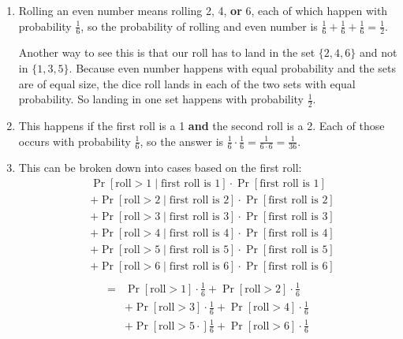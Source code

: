 \begin{answer}
    \renewcommand{\labelenumi}{(\alph{enumi})} 
    \begin{enumerate}
        \item Rolling an even number means rolling 2, 4, \textbf{or} 6, each 
        of which happen with probability $\frac{1}{6}$, so the probability of 
        rolling and even number is $\frac{1}{6}+\frac{1}{6}+\frac{1}{6}=\frac{1}{2}$.

        Another way to see this is that our roll has to land in the set 
        $\{2,4,6\}$ and not in $\{1,3,5\}$. Because even number happens 
        with equal probability and the sets are of equal size, the dice 
        roll lands in each of the two sets with equal probability. So landing 
        in one set happens with probability $\frac{1}{2}$.
        \item This happens if the first roll is a 1 \textbf{and} the second roll 
        is a 2. Each of those occurs with probability $\frac{1}{6}$, so the 
        answer is $\frac{1}{6}\cdot \frac{1}{6} = \frac{1}{6\cdot6}=\frac{1}{36}$.
        \item This can be broken down into cases based on the first roll:
        \begin{align*}
            &\Pr[\text{roll} > 1 \mid \text{first roll is }1]\cdot\Pr[\text{first roll is }1]\\
            &+\Pr[\text{roll} > 2 \mid \text{first roll is }2]\cdot\Pr[\text{first roll is }2]\\
            &+\Pr[\text{roll} > 3 \mid \text{first roll is }3]\cdot\Pr[\text{first roll is }3]\\
            &+\Pr[\text{roll} > 4 \mid \text{first roll is }4]\cdot\Pr[\text{first roll is }4]\\
            &+\Pr[\text{roll} > 5 \mid \text{first roll is }5]\cdot\Pr[\text{first roll is }5]\\
            &+\Pr[\text{roll} > 6 \mid \text{first roll is }6]\cdot\Pr[\text{first roll is }6]\\
        \end{align*}
        \begin{align*}
            =&\Pr[\text{roll} > 1]\cdot \frac{1}{6}
            +\Pr[\text{roll} > 2]\cdot \frac{1}{6}\\
            &+\Pr[\text{roll} > 3]\cdot \frac{1}{6}
            +\Pr[\text{roll} > 4]\cdot \frac{1}{6}\\
            &+\Pr[\text{roll} > 5\cdot] \frac{1}{6}
            +\Pr[\text{roll} > 6]\cdot \frac{1}{6}\\

\end{align*}
\end{enumerate}
\end{answer}
